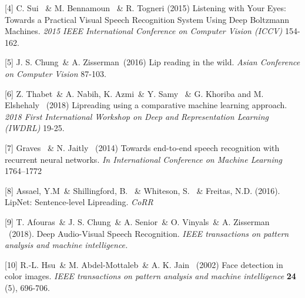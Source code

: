 \documentclass{article}
\begin{document}
[4] C. Sui \ \& M. Bennamoun \ \& R. Togneri (2015) Listening with Your Eyes: Towards a Practical Visual Speech Recognition System Using Deep Boltzmann Machines. {\it 2015 IEEE International Conference on Computer Vision (ICCV)} 154-162.

[5] J. S. Chung\ \& A. Zisserman\ (2016) Lip reading in the wild. {\it Asian Conference on Computer Vision} 87-103.

[6] Z. Thabet\ \& A. Nabih, K. Azmi\ \& Y. Samy \ \& G. Khoriba and M. Elshehaly \ (2018) Lipreading using a comparative machine learning approach. {\it 2018 First International Workshop on Deep and Representation Learning (IWDRL)} 19-25.

[7]  Graves \ \& N. Jaitly \ (2014) Towards end-to-end speech recognition with recurrent neural networks. {\it In International Conference on Machine Learning} 1764–1772

[8] Assael, Y.M\ \& Shillingford, B. \ \& Whiteson, S. \ \& Freitas, N.D. (2016). LipNet: Sentence-level Lipreading. {\it CoRR}

[9] T. Afouras\ \& J. S. Chung\ \& A. Senior\ \& O. Vinyals\ \& A. Zisserman \ (2018). Deep Audio-Visual Speech Recognition. {\it IEEE transactions on pattern analysis and machine intelligence.}

[10] R.-L. Hsu\ \& M. Abdel-Mottaleb\ \& A. K. Jain \ (2002) Face detection in color images. {\it IEEE transactions on pattern analysis and machine intelligence} {\bf 24} (5), 696-706.
\end{document}
